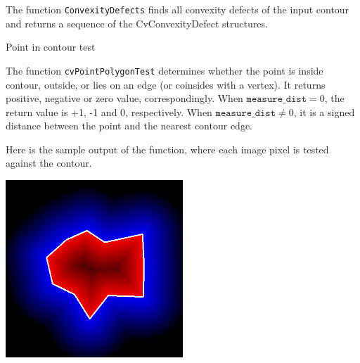 \begin{description}
\end{description}

The function \texttt{ConvexityDefects} finds all convexity defects of the input contour and returns a sequence of the CvConvexityDefect structures.

\label{PointPolygonTest}

Point in contour test


\begin{description}
\end{description}

The function \texttt{cvPointPolygonTest} determines whether the
point is inside contour, outside, or lies on an edge (or coinsides
with a vertex). It returns positive, negative or zero value,
correspondingly. When $\texttt{measure\_dist} =0$, the return value
is +1, -1 and 0, respectively. When $\texttt{measure\_dist} \ne 0$,
it is a signed distance between the point and the nearest contour
edge.

Here is the sample output of the function, where each image pixel is tested against the contour.

\includegraphics[width=0.5\textwidth]{pics/pointpolygon.png}

